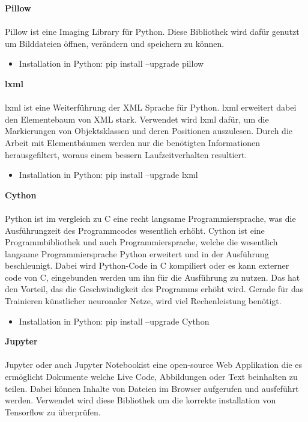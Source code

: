 \documentclass[a4paper,12pt,oneside]{article}
\begin{document}
\textbf{Pillow}\\\\
Pillow ist eine \glqq Imaging Library \glqq für Python. Diese Bibliothek wird dafür genutzt um Bilddateien öffnen, verändern und speichern zu können.

  \begin{itemize}
\item Installation in Python: pip install --upgrade pillow
  \end{itemize}

\textbf{lxml}\\\\ 
lxml ist eine Weiterführung der XML Sprache für Python. lxml erweitert dabei den Elementebaum von XML stark. Verwendet wird lxml dafür, um die Markierungen von Objektsklassen und deren Positionen auszulesen. Durch die Arbeit mit Elementbäumen werden nur die benötigten Informationen herausgefiltert, woraus einem bessern Laufzeitverhalten resultiert.
  
  \begin{itemize}
\item Installation in Python: pip install --upgrade lxml
  \end{itemize}
  
  
\textbf{Cython}\\\\
Python ist im vergleich zu C eine recht langsame Programmiersprache, was die Ausführungzeit des Programmcodes wesentlich erhöht. Cython ist eine Programmbibliothek und auch Programmiersprache, welche die wesentlich langsame Programmiersprache Python erweitert und in der Ausführung beschleunigt. Dabei wird Python-Code in C kompiliert oder es kann externer code von C, eingebunden werden um ihn für die Ausführung zu nutzen. Das hat den Vorteil, das die Geschwindigkeit des Programms erhöht wird. Gerade für das Trainieren künstlicher neuronaler Netze, wird viel Rechenleistung benötigt.

  \begin{itemize}
\item Installation in Python: pip install --upgrade Cython
  \end{itemize}

\textbf{Jupyter}\\\\
Jupyter oder auch \glqq Jupyter Notebook\grqq ist eine open-source Web Applikation die es ermöglicht Dokumente welche Live Code, Abbildungen oder Text beinhalten zu teilen. Dabei können Inhalte von Dateien im Browser aufgerufen und ausfeführt werden. Verwendet wird diese Bibliothek um die korrekte installation von Tensorflow zu überprüfen.  
\end{document}
